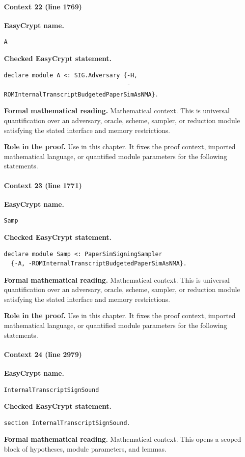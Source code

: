 \paragraph{Context 22 (line 1769)}
\noindent\textbf{EasyCrypt name.}
\begin{lstlisting}[language=EasyCrypt,basicstyle=\ttfamily\scriptsize]
A
\end{lstlisting}
\noindent\textbf{Checked EasyCrypt statement.}
\begin{lstlisting}[language=EasyCrypt,basicstyle=\ttfamily\scriptsize]
declare module A <: SIG.Adversary {-H,
                                   -ROMInternalTranscriptBudgetedPaperSimAsNMA}.
\end{lstlisting}
\noindent\textbf{Formal mathematical reading.}
Mathematical context. This is universal quantification over an adversary, oracle, scheme, sampler, or reduction module satisfying the stated interface and memory restrictions.

\noindent\textbf{Role in the proof.}
Use in this chapter. It fixes the proof context, imported mathematical language, or quantified module parameters for the following statements.

\paragraph{Context 23 (line 1771)}
\noindent\textbf{EasyCrypt name.}
\begin{lstlisting}[language=EasyCrypt,basicstyle=\ttfamily\scriptsize]
Samp
\end{lstlisting}
\noindent\textbf{Checked EasyCrypt statement.}
\begin{lstlisting}[language=EasyCrypt,basicstyle=\ttfamily\scriptsize]
declare module Samp <: PaperSimSigningSampler
  {-A, -ROMInternalTranscriptBudgetedPaperSimAsNMA}.
\end{lstlisting}
\noindent\textbf{Formal mathematical reading.}
Mathematical context. This is universal quantification over an adversary, oracle, scheme, sampler, or reduction module satisfying the stated interface and memory restrictions.

\noindent\textbf{Role in the proof.}
Use in this chapter. It fixes the proof context, imported mathematical language, or quantified module parameters for the following statements.

\paragraph{Context 24 (line 2979)}
\noindent\textbf{EasyCrypt name.}
\begin{lstlisting}[language=EasyCrypt,basicstyle=\ttfamily\scriptsize]
InternalTranscriptSignSound
\end{lstlisting}
\noindent\textbf{Checked EasyCrypt statement.}
\begin{lstlisting}[language=EasyCrypt,basicstyle=\ttfamily\scriptsize]
section InternalTranscriptSignSound.
\end{lstlisting}
\noindent\textbf{Formal mathematical reading.}
Mathematical context. This opens a scoped block of hypotheses, module parameters, and lemmas.

